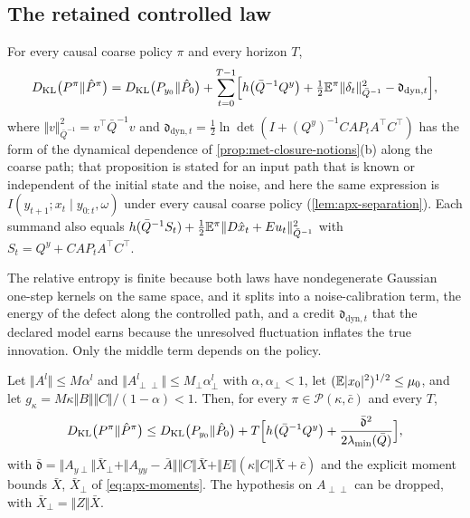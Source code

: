 \subsection{The retained controlled law}

\begin{theorem}\label{thm:apx-path}
For every causal coarse policy $\pi$ and every horizon $T$,
\begin{equation}\label{eq:apx-path}
D_{\mathrm{KL}}\bigl(P^\pi\Vert\hat P^\pi\bigr)=D_{\mathrm{KL}}\bigl(P_{y_0}\Vert\hat P_0\bigr)+\sum_{t=0}^{T-1}\Bigl[h\bigl(\bar Q^{-1}Q^y\bigr)+\tfrac12\mathbb{E}^\pi\Vert\delta_t\Vert^2_{\bar Q^{-1}}-\mathfrak d_{\mathrm{dyn},t}\Bigr],
\end{equation}
where $\Vert v\Vert^2_{\bar Q^{-1}}=v^\top\bar Q^{-1}v$ and $\mathfrak d_{\mathrm{dyn},t}=\frac12\ln\det(I+(Q^y)^{-1}CAP_tA^\top C^\top)$ has the form of the dynamical dependence of \cref{prop:met-closure-notions}(b) along the coarse path; that proposition is stated for an input path that is known or independent of the initial state and the noise, and here the same expression is $I(y_{t+1};x_t\mid y_{0:t},\omega)$ under every causal coarse policy (\cref{lem:apx-separation}). Each summand also equals $h(\bar Q^{-1}S_t)+\frac12\mathbb{E}^\pi\Vert D\hat x_t+Eu_t\Vert^2_{\bar Q^{-1}}$ with $S_t=Q^y+CAP_tA^\top C^\top$.
\end{theorem}

The relative entropy is finite because both laws have nondegenerate Gaussian one-step kernels on the same space, and it splits into a noise-calibration term, the energy of the defect along the controlled path, and a credit $\mathfrak d_{\mathrm{dyn},t}$ that the declared model earns because the unresolved fluctuation inflates the true innovation. Only the middle term depends on the policy.

\begin{corollary}\label{cor:apx-uniform}
Let $\Vert A^l\Vert\le M\alpha^l$ and $\Vert A_{\perp\perp}^l\Vert\le M_\perp\alpha_\perp^l$ with $\alpha,\alpha_\perp<1$, let $(\mathbb{E}\lvert x_0\rvert^2)^{1/2}\le\mu_0$, and let $g_\kappa=M\kappa\Vert B\Vert\Vert C\Vert/(1-\alpha)<1$. Then, for every $\pi\in\mathcal P(\kappa,\bar c)$ and every $T$,
\begin{equation}\label{eq:apx-uniform}
D_{\mathrm{KL}}\bigl(P^\pi\Vert\hat P^\pi\bigr)\le D_{\mathrm{KL}}\bigl(P_{y_0}\Vert\hat P_0\bigr)+T\Bigl[h\bigl(\bar Q^{-1}Q^y\bigr)+\frac{\bar{\mathfrak d}^2}{2\lambda_{\min}(\bar Q)}\Bigr],
\end{equation}
with $\bar{\mathfrak d}=\Vert A_{y\perp}\Vert\bar X_\perp+\Vert A_{yy}-\bar A\Vert\Vert C\Vert\bar X+\Vert E\Vert(\kappa\Vert C\Vert\bar X+\bar c)$ and the explicit moment bounds $\bar X$, $\bar X_\perp$ of \cref{eq:apx-moments}. The hypothesis on $A_{\perp\perp}$ can be dropped, with $\bar X_\perp=\Vert Z\Vert\bar X$.
\end{corollary}

